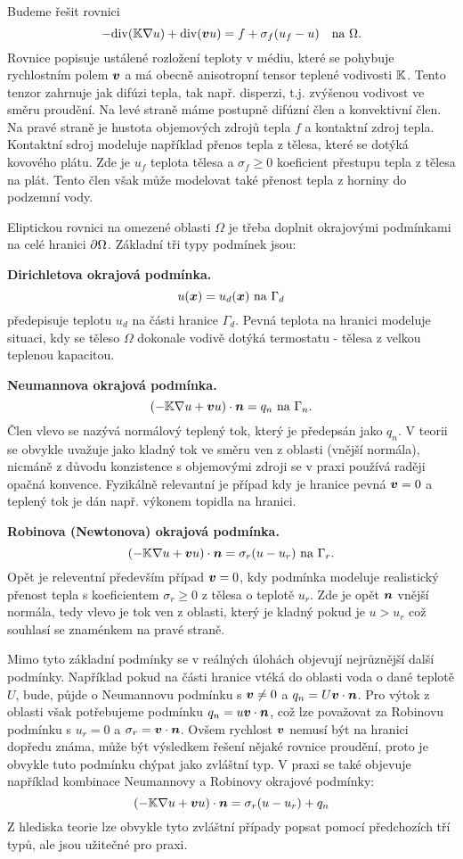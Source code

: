 Budeme řešit rovnici
\begin{equation}
    \label{ModelEq}
   -{\rm div}({\mathbb{K}}\nabla u) + {\rm div}(\mathbf{\boldsymbol{v}} u) =f + \sigma_f(u_f - u) \quad\text{na }\Omega.
\end{equation}
Rovnice popisuje ustálené rozložení teploty v médiu, které se pohybuje rychlostním polem $\mathbf{\boldsymbol{v}}$ a má obecně anisotropní 
tensor teplené vodivosti ${\mathbb{K}}$. Tento tenzor zahrnuje jak difúzi tepla, tak např. disperzi, t.j. zvýšenou vodivost ve směru proudění.
Na levé straně máme postupně difúzní člen a konvektivní člen. Na pravé straně je hustota objemových zdrojů tepla $f$ a kontaktní zdroj tepla.
Kontaktní sdroj modeluje například přenos tepla z tělesa, které se dotýká kovového plátu. Zde je $u_f$ teplota tělesa a $\sigma_f\ge 0$
koeficient přestupu tepla z tělesa na plát. Tento člen však může modelovat také přenost tepla z horniny do podzemní vody.

Eliptickou rovnici na omezené oblasti $\Omega$ je třeba doplnit okrajovými podmínkami na celé hranici $\partial \Omega$. Základní tři typy podmínek jsou:

{\bf Dirichletova okrajová podmínka.} 
\[
    u(\mathbf{\boldsymbol{x}}) = u_d(\mathbf{\boldsymbol{x}})\text{ na }\Gamma_d
\]
předepisuje teplotu $u_d$ na části hranice $\Gamma_d$. Pevná teplota na hranici modeluje situaci, kdy se těleso $\Omega$ dokonale vodivě dotýká termostatu - 
tělesa z velkou teplenou kapacitou.

{\bf Neumannova okrajová podmínka.}
\[
    (-{\mathbb{K}} \nabla u + \mathbf{\boldsymbol{v}} u) \cdot \mathbf{\boldsymbol{n}} = q_n\text{ na }\Gamma_n.
\]
Člen vlevo se nazývá normálový teplený tok, který je předepsán jako $q_n$. V teorii se obvykle uvažuje jako kladný tok ve směru ven z oblasti (vnější normála), 
nicmáně z důvodu konzistence s objemovými zdroji se v praxi používá raději opačná konvence. Fyzikálně relevantní je případ kdy je hranice pevná 
$\mathbf{\boldsymbol{v}} = 0$ a teplený tok je dán např. výkonem topidla na hranici. 

{\bf Robinova (Newtonova) okrajová podmínka.}
\[
     (-{\mathbb{K}} \nabla u + \mathbf{\boldsymbol{v}} u) \cdot \mathbf{\boldsymbol{n}} = \sigma_r(u - u_r)\text{ na }\Gamma_r. 
\]
Opět je releventní především případ $\mathbf{\boldsymbol{v}} =0$, kdy podmínka modeluje realistický přenost tepla s koeficientem $\sigma_r\ge 0$ z tělesa o teplotě $u_r$.
Zde je opět $\mathbf{\boldsymbol{n}}$ vnější normála, tedy vlevo je tok ven z oblasti, který je kladný pokud je $u > u_r$ což souhlasí se znaménkem na pravé straně.

Mimo tyto základní podmínky se v reálných úlohách objevují nejrůznější další podmínky. Například pokud na části hranice vtéká do oblasti 
voda o dané teplotě $U$, bude, půjde o Neumannovu podmínku s $\mathbf{\boldsymbol{v}}\ne 0$ a 
$q_n=U\mathbf{\boldsymbol{v}} \cdot \mathbf{\boldsymbol{n}}$. Pro výtok z oblasti však potřebujeme podmínku $q_n=u\mathbf{\boldsymbol{v}} \cdot \mathbf{\boldsymbol{n}}$, což lze považovat za Robinovu podmínku s $u_r=0$ 
a $\sigma_r=\mathbf{\boldsymbol{v}} \cdot\mathbf{\boldsymbol{n}}$. Ovšem rychlost $\mathbf{\boldsymbol{v}}$ nemusí být na hranici dopředu známa, může být výsledkem řešení nějaké rovnice proudění, proto 
je obvykle tuto podmínku chýpat jako zvláštní typ.
V praxi se také objevuje například kombinace Neumannovy a Robinovy okrajové podmínky:
\[
    (-{\mathbb{K}} \nabla u + \mathbf{\boldsymbol{v}} u)\cdot \mathbf{\boldsymbol{n}} = \sigma_r(u - u_r) + q_n
\]
Z hlediska teorie lze obvykle tyto zvláštní případy popsat pomocí předchozích tří typů, ale jsou užitečné pro praxi.

